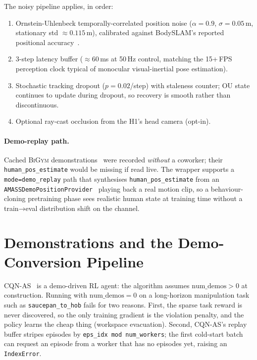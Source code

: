 \documentclass[11pt,a4paper]{report}
\newcommand{\bigym}{\textsc{BiGym}}
\newcommand{\cqnas}{CQN-AS}
\newcommand{\bodyslampp}{BodySLAM\nolinebreak[4]\hspace{-.05em}\raisebox{.2ex}{\scriptsize ++}}
\begin{document}
The noisy pipeline applies, in order:
\begin{enumerate}[topsep=2pt,itemsep=1pt]
\item Ornstein-Uhlenbeck temporally-correlated position noise
  ($\alpha = 0.9$, $\sigma = 0.05$\,m, stationary std $\approx
  0.115$\,m), calibrated against \bodyslampp{}'s reported
  positional accuracy~\cite{henning2023bodyslampp}.
\item 3-step latency buffer ($\approx 60$\,ms at 50\,Hz control,
  matching the 15+\,FPS perception clock typical of monocular
  visual-inertial pose estimation).
\item Stochastic tracking dropout ($p = 0.02$/step) with staleness
  counter; OU state continues to update during dropout, so
  recovery is smooth rather than discontinuous.
\item Optional ray-cast occlusion from the H1's head camera
  (opt-in).
\end{enumerate}

\paragraph{Demo-replay path.}
Cached \bigym{} demonstrations~\cite{chernyadev2024bigym} were
recorded \emph{without} a coworker; their
\texttt{human\_pos\_estimate} would be missing if read live. The
wrapper supports a \texttt{mode=demo\_replay} path that synthesises
\texttt{human\_pos\_estimate} from an
\texttt{AMASSDemoPositionProvider}~\cite{mahmood2019amass} playing
back a real motion clip, so a behaviour-cloning pretraining phase
sees realistic human state at training time without a train→eval
distribution shift on the channel.

\section{Demonstrations and the Demo-Conversion Pipeline}
\label{sec:bench:demos}

\cqnas{}~\cite{seo2024cqnas} is a demo-driven RL agent: the
algorithm assumes $\text{num\_demos} > 0$ at construction.
Running with $\text{num\_demos} = 0$ on a long-horizon manipulation
task such as \texttt{saucepan\_to\_hob} fails for two reasons.
First, the sparse task reward is never discovered, so the only
training gradient is the violation penalty, and the policy learns
the cheap thing (workspace evacuation). Second, \cqnas{}'s replay
buffer stripes episodes by \texttt{eps\_idx mod num\_workers}; the
first cold-start batch can request an episode from a worker that
has no episodes yet, raising an \texttt{IndexError}.
\end{document}
